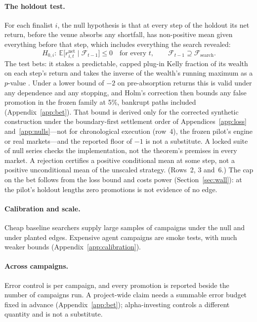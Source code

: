 \documentclass[11pt]{article}
\newcommand{\E}{\mathbb{E}}
\begin{document}
\paragraph{The holdout test.} For each finalist $i$, the null hypothesis is that at every step of the holdout its net return, before the venue absorbs any shortfall, has non-positive mean given everything before that step, which includes everything the search revealed:
\begin{equation}
  H_{0,i}:\ \E\big[r^{\mathrm{net}}_{i,t} \mid \mathcal{F}_{t-1}\big] \le 0 \quad \text{for every } t, \qquad \mathcal{F}_{t-1} \supseteq \mathcal{F}_{\mathrm{search}} .
\end{equation}
The test bets: it stakes a predictable, capped plug-in Kelly fraction of its wealth on each step's return and takes the inverse of the wealth's running maximum as a $p$-value \cite{ville1939,shafer2021}. Under a lower bound of $-2$ on pre-absorption returns this is valid under any dependence and any stopping, and Holm's correction then bounds any false promotion in the frozen family at 5\%, bankrupt paths included (Appendix~\ref{app:bet}). That bound is derived only for the corrected synthetic construction under the boundary-first settlement order of Appendices~\ref{app:loss} and~\ref{app:nulls}---not for chronological execution (row~4), the frozen pilot's engine or real markets---and the reported floor of $-1$ is not a substitute. A locked suite of null series checks the implementation, not the theorem's premises in every market. A rejection certifies a positive conditional mean at some step, not a positive unconditional mean of the unscaled strategy. (Rows~2, 3 and~6.) The cap on the bet follows from the loss bound and costs power (Section~\ref{sec:wall}): at the pilot's holdout lengths zero promotions is not evidence of no edge.

\paragraph{Calibration and scale.} Cheap baseline searchers supply large samples of campaigns under the null and under planted edges. Expensive agent campaigns are smoke tests, with much weaker bounds (Appendix~\ref{app:calibration}).

\paragraph{Across campaigns.} Error control is per campaign, and every promotion is reported beside the number of campaigns run. A project-wide claim needs a summable error budget fixed in advance (Appendix~\ref{app:bet}); alpha-investing \cite{foster2008} controls a different quantity and is not a substitute.
\end{document}
